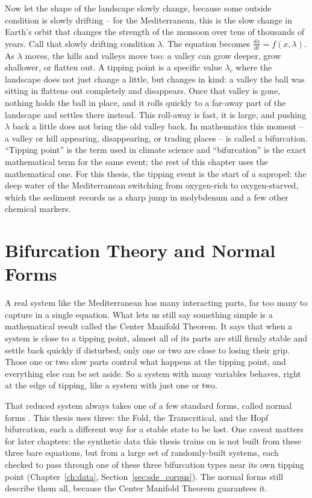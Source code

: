 Now let the shape of the landscape slowly change, because some outside condition is slowly drifting -- for the Mediterranean, this is the slow change in Earth's orbit that changes the strength of the monsoon over tens of thousands of years. Call that slowly drifting condition $\lambda$. The equation becomes $\frac{dx}{dt} = f(x, \lambda)$. As $\lambda$ moves, the hills and valleys move too: a valley can grow deeper, grow shallower, or flatten out. A tipping point is a specific value $\lambda_c$ where the landscape does not just change a little, but changes in kind: a valley the ball was sitting in flattens out completely and disappears. Once that valley is gone, nothing holds the ball in place, and it rolls quickly to a far-away part of the landscape and settles there instead. This roll-away is fast, it is large, and pushing $\lambda$ back a little does not bring the old valley back. In mathematics this moment -- a valley or hill appearing, disappearing, or trading places -- is called a bifurcation. ``Tipping point'' is the term used in climate science and ``bifurcation'' is the exact mathematical term for the same event; the rest of this chapter uses the mathematical one. For this thesis, the tipping event is the start of a sapropel: the deep water of the Mediterranean switching from oxygen-rich to oxygen-starved, which the sediment records as a sharp jump in molybdenum and a few other chemical markers.

\section{Bifurcation Theory and Normal Forms}
\label{sec:normal_forms}
A real system like the Mediterranean has many interacting parts, far too many to capture in a single equation. What lets us still say something simple is a mathematical result called the Center Manifold Theorem. It says that when a system is close to a tipping point, almost all of its parts are still firmly stable and settle back quickly if disturbed; only one or two are close to losing their grip. Those one or two slow parts control what happens at the tipping point, and everything else can be set aside. So a system with many variables behaves, right at the edge of tipping, like a system with just one or two.

That reduced system always takes one of a few standard forms, called normal forms \citep{kuznetsov2004,strogatz2015}. This thesis uses three: the Fold, the Transcritical, and the Hopf bifurcation, each a different way for a stable state to be lost. One caveat matters for later chapters: the synthetic data this thesis trains on is not built from these three bare equations, but from a large set of randomly-built systems, each checked to pass through one of these three bifurcation types near its own tipping point (Chapter~\ref{ch:data}, Section~\ref{sec:sde_corpus}). The normal forms still describe them all, because the Center Manifold Theorem guarantees it.

